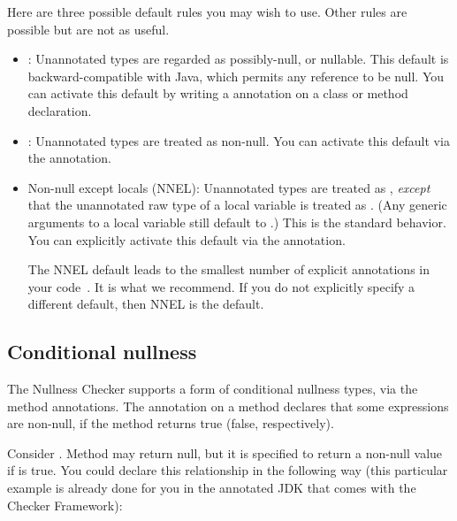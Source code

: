 \begin{sloppy}
Here are three possible default rules you may wish to use.  Other rules are
possible but are not as useful.
\begin{itemize}
\item
  :  Unannotated types are regarded as possibly-null, or
  nullable.  This default is backward-compatible with Java, which permits
  any reference to be null.  You can activate this default by writing
  a  annotation on a
  class or method
  declaration.
\item
  :  Unannotated types are treated as non-null.
  You can activate this
  default via the
   annotation.
\item
  Non-null except locals (NNEL):  Unannotated types are treated as
  , \emph{except} that the
  unannotated raw type of a local variable is treated as
  .  (Any generic arguments to a
  local variable still default to
  .)  This is the standard
  behavior.  You can explicitly activate this default via the
  annotation.

  The NNEL default leads to the smallest number of explicit annotations in
  your code~\cite{PapiACPE2008}.  It is what we recommend.  If you do not
  explicitly specify a different default, then NNEL is the default.
\end{itemize}
\end{sloppy}

\subsection{Conditional nullness\label{conditional-nullness}}

The Nullness Checker supports a form of conditional nullness types, via the
 method annotations.
The annotation on a method declares that some expressions are non-null, if
the method returns true (false, respectively).

Consider .
Method
may return null, but it is specified to return a non-null value if
 is
true.
You could declare this relationship in the following way (this particular
example is already
done for you in the annotated JDK that comes with the Checker Framework):

